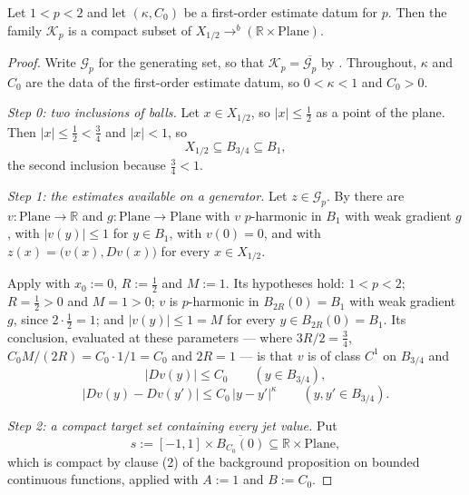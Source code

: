 \begin{lemma}
Let $1<p<2$ and let $(\kappa,C_0)$ be a first-order estimate datum for $p$.  Then the family
$\mathcal{K}_p$ is a compact subset of $X_{1/2}\to^{b}(\mathbb{R}\times\mathrm{Plane})$.
\end{lemma}
\begin{proof}
Write $\mathcal{G}_p$ for the generating set, so that $\mathcal{K}_p=\overline{\mathcal{G}_p}$ by
.  Throughout, $\kappa$ and $C_0$ are the data of the first-order
estimate datum, so $0<\kappa<1$ and $C_0>0$.

\medskip\noindent\emph{Step 0: two inclusions of balls.}
Let $x\in X_{1/2}$, so $\lvert x\rvert\le\tfrac12$ as a point of the plane.  Then
$\lvert x\rvert\le\tfrac12<\tfrac34$ and $\lvert x\rvert<1$, so
\begin{equation}\label{eq:cjfc-incl}
  X_{1/2}\subseteq B_{3/4}\subseteq B_1 ,
\end{equation}
the second inclusion because $\tfrac34<1$.

\medskip\noindent\emph{Step 1: the estimates available on a generator.}
Let $z\in\mathcal{G}_p$.  By  there are
$v\colon\mathrm{Plane}\to\mathbb{R}$ and $g\colon\mathrm{Plane}\to\mathrm{Plane}$ with $v$
$p$-harmonic in $B_1$ with weak gradient $g$, with $\lvert v(y)\rvert\le1$ for $y\in B_1$, with
$v(0)=0$, and with $z(x)=\bigl(v(x),Dv(x)\bigr)$ for every $x\in X_{1/2}$.

Apply  with $x_0:=0$, $R:=\tfrac12$ and $M:=1$.  Its hypotheses
hold: $1<p<2$; $R=\tfrac12>0$ and $M=1>0$; $v$ is $p$-harmonic in $B_{2R}(0)=B_1$ with weak
gradient $g$, since $2\cdot\tfrac12=1$; and $\lvert v(y)\rvert\le1=M$ for every
$y\in B_{2R}(0)=B_1$.  Its conclusion, evaluated at these parameters --- where
$3R/2=\tfrac34$, $C_0M/(2R)=C_0\cdot1/1=C_0$ and $2R=1$ --- is that $v$ is of class $C^1$ on
$B_{3/4}$ and
\begin{equation}\label{eq:cjfc-grad}
  \lvert Dv(y)\rvert\le C_0\qquad(y\in B_{3/4}),
\end{equation}
\begin{equation}\label{eq:cjfc-hol}
  \lvert Dv(y)-Dv(y')\rvert\le C_0\,\lvert y-y'\rvert^{\kappa}\qquad(y,y'\in B_{3/4}).
\end{equation}

\medskip\noindent\emph{Step 2: a compact target set containing every jet value.}
Put
\[
  s:=[-1,1]\times\overline{B_{C_0}(0)}\subseteq\mathbb{R}\times\mathrm{Plane},
\]
which is compact by clause (2) of the background proposition on bounded continuous functions,
applied with $A:=1$ and $B:=C_0$.


\end{proof}
